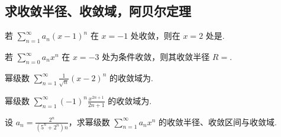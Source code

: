 \subsection{求收敛半径、收敛域，阿贝尔定理}

	\begin{ti}
		若 $\sum_{n=1}^{\infty} a_{n} (x - 1)^{n}$ 在 $x = -1$ 处收敛，则在 $x = 2$ 处是\kuo.

	\end{ti}

	\begin{ti}
		若 $\sum_{n=0}^{\infty} a_{n} x^{n}$ 在 $x = -3$ 处为条件收敛，则其收敛半径 $R = $\htwo.
	\end{ti}

	\begin{ti}
		幂级数 $\sum_{n=1}^{\infty} \frac{1}{\sqrt{n}} (x - 2)^{n}$ 的收敛域为\htwo.
	\end{ti}

	\begin{ti}
		幂级数 $\sum_{n=1}^{\infty} (-1)^{n} \frac{x^{2n+1}}{2n+1}$ 的收敛域为\htwo.
	\end{ti}

	\begin{ti}
		设 $a_{n} = \frac{2^{n}}{(5^{n} + 2^{n})n}$，求幂级数 $\sum_{n=1}^{\infty} a_{n} x^{n}$ 的收敛半径、收敛区间与收敛域.
	\end{ti}